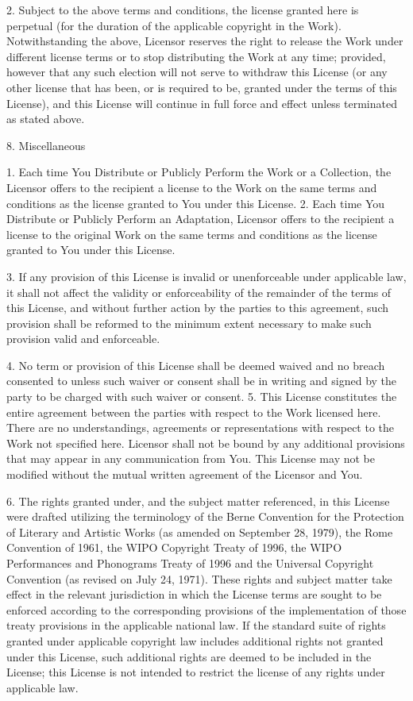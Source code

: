 2. Subject to the above terms and conditions, the license granted
here is perpetual (for the duration of the applicable copyright in
the Work). Notwithstanding the above, Licensor reserves the right
to release the Work under different license terms or to stop
distributing the Work at any time; provided, however that any such
election will not serve to withdraw this License (or any other
license that has been, or is required to be, granted under the
terms of this License), and this License will continue in full
force and effect unless terminated as stated above.

8. Miscellaneous

1. Each time You Distribute or Publicly Perform the Work or a
Collection, the Licensor offers to the recipient a license to the
Work on the same terms and conditions as the license granted to You
under this License. 2. Each time You Distribute or Publicly Perform
an Adaptation, Licensor offers to the recipient a license to the
original Work on the same terms and conditions as the license
granted to You under this License.

3. If any provision of this License is invalid or unenforceable
under applicable law, it shall not affect the validity or
enforceability of the remainder of the terms of this License, and
without further action by the parties to this agreement, such
provision shall be reformed to the minimum extent necessary to make
such provision valid and enforceable.

4. No term or provision of this License shall be deemed waived and
no breach consented to unless such waiver or consent shall be in
writing and signed by the party to be charged with such waiver or
consent. 5. This License constitutes the entire agreement between
the parties with respect to the Work licensed here. There are no
understandings, agreements or representations with respect to the
Work not specified here. Licensor shall not be bound by any
additional provisions that may appear in any communication from
You. This License may not be modified without the mutual written
agreement of the Licensor and You.

6. The rights granted under, and the subject matter referenced, in
this License were drafted utilizing the terminology of the Berne
Convention for the Protection of Literary and Artistic Works (as
amended on September 28, 1979), the Rome Convention of 1961, the
WIPO Copyright Treaty of 1996, the WIPO Performances and Phonograms
Treaty of 1996 and the Universal Copyright Convention (as revised
on July 24, 1971). These rights and subject matter take effect in
the relevant jurisdiction in which the License terms are sought to
be enforced according to the corresponding provisions of the
implementation of those treaty provisions in the applicable
national law. If the standard suite of rights granted under
applicable copyright law includes additional rights not granted
under this License, such additional rights are deemed to be
included in the License; this License is not intended to restrict
the license of any rights under applicable law.

